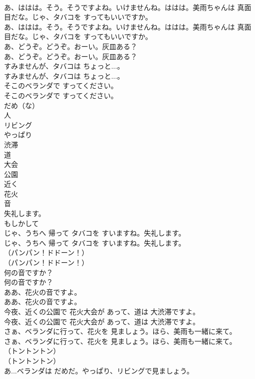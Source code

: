 \documentclass[8pt]{extreport}
\begin{document}
\begin{CJK}{UTF8}{min}
\\	あ、ははは。そう。そうですよね。いけませんね。ははは。美雨ちゃんは 真面目だな。じゃ、タバコを すってもいいですか。	
\\	あ、ははは。そう。そうですよね。いけませんね。ははは。美雨ちゃんは 真面目だな。じゃ、タバコを すってもいいですか。 
\\	あ、どうぞ。どうぞ。おーい。灰皿ある？	
\\	あ、どうぞ。どうぞ。おーい。灰皿ある？ 
\\	すみませんが、タバコは ちょっと...。	
\\	すみませんが、タバコは ちょっと...。 
\\	そこのベランダで すってください。	
\\	そこのベランダで すってください。 
\\	だめ（な）
\\	人
\\	リビング
\\	やっぱり
\\	渋滞
\\	道
\\	大会
\\	公園
\\	近く
\\	花火
\\	音
\\	失礼します。
\\	もしかして
\\	じゃ、うちへ 帰って タバコを すいますね。失礼します。	
\\	じゃ、うちへ 帰って タバコを すいますね。失礼します。 
\\	（パンパン！ドドーン！）	
\\	（パンパン！ドドーン！） 
\\	何の音ですか？	
\\	何の音ですか？ 
\\	ああ、花火の音ですよ。	
\\	ああ、花火の音ですよ。 
\\	今夜、近くの公園で 花火大会が あって、道は 大渋滞ですよ。	
\\	今夜、近くの公園で 花火大会が あって、道は 大渋滞ですよ。 
\\	さぁ、ベランダに行って、花火を 見ましょう。ほら、美雨も一緒に来て。	
\\	さぁ、ベランダに行って、花火を 見ましょう。ほら、美雨も一緒に来て。 
\\	（トントントン）	
\\	（トントントン） 
\\	あ...ベランダは だめだ。やっぱり、リビングで見ましょう。	

\end{CJK}
\end{document}
